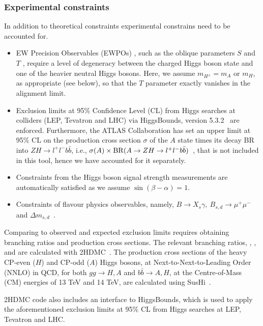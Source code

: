 \subsubsection{Experimental constraints}
In addition to theoretical constraints experimental constrains need to be accounted for.
\begin{itemize}
	\item EW Precision Observables (EWPOs) \cite{Haller:2018nnx}, such as the oblique parameters $S$ and $T$ \cite{Peskin:1991sw, Grimus:2008nb}, require a level of degeneracy between the charged Higgs boson state and one of the heavier neutral Higgs bosons. Here, we assume $m_{H^\pm} = m_{A}$  or $m_H$, as appropriate (see below), so that the $T$ parameter exactly vanishes in the alignment limit. 
    \item Exclusion limits at 95\% Confidence Level (CL) from Higgs searches at colliders (LEP, Tevatron and LHC) via HiggsBounds, version 5.3.2~\cite{Bechtle:2008jh, Bechtle:2011sb, Bechtle:2013wla} are enforced.
    Furthermore, the ATLAS Collaboration has set an upper limit at 95\% CL on the production cross section $\sigma$ of the $A$ state times its decay BR into $ZH\to l^+l^-b\bar b$, i.e., \(\sigma(A)\times {\rm BR}(A\rightarrow ZH \rightarrow l^+l^-b\bar b)\)~\cite{Aaboud:2018eoy}, that is not included in this tool, hence we have accounted for it separately.
	
\item Constraints from the Higgs boson signal strength measurements are automatically satisfied as we assume $\sin(\beta-\alpha) =1$.	
	
\item Constraints of {flavour physics observables,} namely, \(B \rightarrow X_s \gamma,~ B_{s,d} \rightarrow \mu^+\mu^-\) and \(\Delta m_{s,d}\)~\cite{Haller:2018nnx}.		
\end{itemize}

Comparing to observed and expected exclusion limits requires obtaining branching ratios and production cross sections.
The relevant branching ratios, \AZH{}, \HZA{}, \Abb{} and \Hbb{} are calculated with 2HDMC~\cite{Eriksson:2009ws}.
The production cross sections of the heavy CP-even ($H$) and CP-odd ($A$) Higgs bosons,
at Next-to-Next-to-Leading Order (NNLO) in QCD, 
for both $gg\to H,A$ and $b\bar b\to A,H$, at the Centre-of-Mass (CM) energies of 13 TeV and 14 TeV,
are calculated using SusHi~\cite{Harlander:2012pb, Harlander:2016hcx, Harlander:2002wh, Harlander:2003ai}. 

2HDMC code also includes an interface to HiggsBounds, which is used to apply the aforementioned exclusion limits at 95\% CL from Higgs searches at LEP, Tevatron and LHC.

